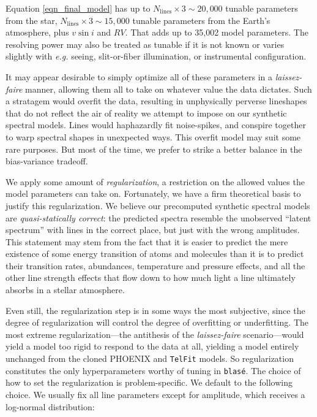 \documentclass[modern]{aastex631}
\begin{document}
Equation \ref{eqn_final_model} has up to $N_{\mathrm{lines}}\times3 \sim20,000$ tunable parameters from the star, $N_{\mathrm{lines}}\times3 \sim15,000$ tunable parameters from the Earth's atmosphere, plus $v\sin{i}$ and $RV$.  That adds up to 35,002 model parameters.  The resolving power may also be treated as tunable if it is not known or varies slightly with \emph{e.g.} seeing, slit-or-fiber illumination, or instrumental configuration.

It may appear desirable to simply optimize all of these parameters in a \emph{laissez-faire} manner, allowing them all to take on whatever value the data dictates.  Such a stratagem would overfit the data, resulting in unphysically perverse lineshapes that do not reflect the air of reality we attempt to impose on our synthetic spectral models.  Lines would haphazardly fit noise-spikes, and conspire together to warp spectral shapes in unexpected ways.  This overfit model may suit some rare purposes.  But most of the time, we prefer to strike a better balance in the bias-variance tradeoff.

We apply some amount of \emph{regularization}, a restriction on the allowed values the model parameters can take on.  Fortunately, we have a firm theoretical basis to justify this regularization.  We believe our precomputed synthetic spectral models are \emph{quasi-statically correct}: the predicted spectra resemble the unobserved ``latent spectrum'' with lines in the correct place, but just with the wrong amplitudes.  This statement may stem from the fact that it is easier to predict the mere existence of some energy transition of atoms and molecules than it is to predict their transition rates, abundances, temperature and pressure effects, and all the other line strength effects that flow down to how much light a line ultimately absorbs in a stellar atmosphere.

Even still, the regularization step is in some ways the most subjective, since the degree of regularization will control the degree of overfitting or underfitting. The most extreme regularization---the antithesis of the \emph{laissez-faire} scenario---would yield a model too rigid to respond to the data at all, yielding a model entirely unchanged from the cloned PHOENIX and \texttt{TelFit} models.  So regularization constitutes the only hyperparameters worthy of tuning in \texttt{blas\'e}.  The choice of how to set the regularization is problem-specific.  We default to the following choice. We usually fix all line parameters except for amplitude, which receives a log-normal distribution:
\end{document}
